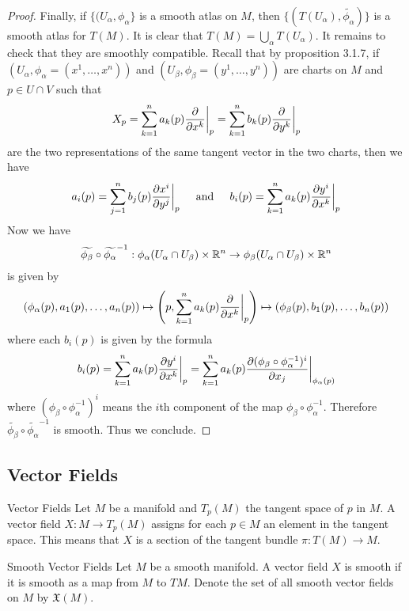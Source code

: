 \documentclass[a4paper]{article}
\begin{document}
\begin{thm}{}{}
\begin{proof}
Finally, if $\{(U_\alpha,\phi_\alpha\}$ is a smooth atlas on $M$, then $\{(T(U_\alpha),\widetilde{\phi_\alpha})\}$ is a smooth atlas for $T(M)$. It is clear that $T(M)=\bigcup_{\alpha}T(U_\alpha)$. It remains to check that they are smoothly compatible. Recall that by proposition 3.1.7, if $(U_\alpha,\phi_\alpha=(x^1,\dots,x^n))$ and $(U_\beta,\phi_\beta=(y^1,\dots,y^n))$ are charts on $M$ and $p\in U\cap V$ such that $$X_p=\sum_{k=1}^na_k(p)\frac{\partial}{\partial x^k}\bigg{|}_p=\sum_{k=1}^nb_k(p)\frac{\partial}{\partial y^k}\bigg{|}_p$$ are the two representations of the same tangent vector in the two charts, then we have $$a_i(p)=\sum_{j=1}^nb_j(p)\frac{\partial x^i}{\partial y^j}\bigg{|}_p\;\;\;\;\text{ and }\;\;\;\; b_i(p)=\sum_{k=1}^na_k(p)\frac{\partial y^i}{\partial x^k}\bigg{|}_p$$ Now we have $$\widetilde{\phi_\beta}\circ\widetilde{\phi_\alpha}^{-1}:\phi_\alpha(U_\alpha\cap U_\beta)\times\mathbb{R}^n\to\phi_\beta(U_\alpha\cap U_\beta)\times\mathbb{R}^n$$ is given by $$(\phi_\alpha(p),a_1(p),\dots,a_n(p))\mapsto\left(p,\sum_{k=1}^na_k(p)\frac{\partial}{\partial x^k}\bigg{|}_p\right)\mapsto(\phi_\beta(p),b_1(p),\dots,b_n(p))$$ where each $b_i(p)$ is given by the formula $$b_i(p)=\sum_{k=1}^na_k(p)\frac{\partial y^i}{\partial x^k}\bigg{|}_p=\sum_{k=1}^na_k(p)\frac{\partial(\phi_\beta\circ\phi_\alpha^{-1})^i}{\partial x_j}\bigg{|}_{\phi_\alpha(p)}$$ where $(\phi_\beta\circ\phi_\alpha^{-1})^i$ means the $i$th component of the map $\phi_\beta\circ\phi_\alpha^{-1}$. Therefore $\widetilde{\phi_\beta}\circ\widetilde{\phi_\alpha}^{-1}$ is smooth. Thus we conclude. 
\end{proof}
\end{thm}

\subsection{Vector Fields}
\begin{defn}{Vector Fields}{} Let $M$ be a manifold and $T_p(M)$ the tangent space of $p$ in $M$. A vector field $X:M\to T_p(M)$ assigns for each $p\in M$ an element in the tangent space. This means that $X$ is a section of the tangent bundle $\pi:T(M)\to M$. 
\end{defn}

\begin{defn}{Smooth Vector Fields}{} Let $M$ be a smooth manifold. A vector field $X$ is smooth if it is smooth as a map from $M$ to $TM$. Denote the set of all smooth vector fields on $M$ by $\mathfrak{X}(M)$. 
\end{defn}
\end{document}
